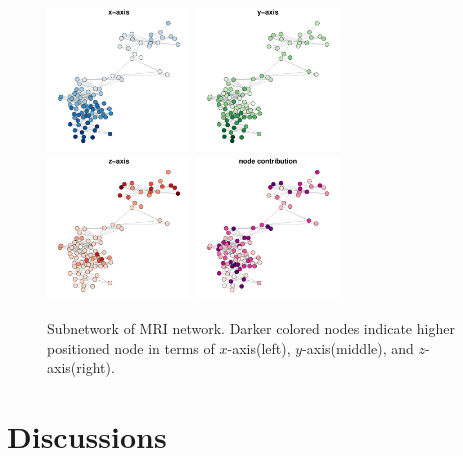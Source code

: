 \documentclass[12pt]{article}
\theoremstyle{definition}
\begin{document}
\begin{figure}[H]
	\centering
		\includegraphics[width=1.5in]{../Figure/brain1_x.pdf}
		\includegraphics[width=1.5in]{../Figure/brain1_y.pdf}
		\includegraphics[width=1.5in]{../Figure/brain1_z.pdf}
		\includegraphics[width=1.5in]{../Figure/brain1_weight.pdf}
	\caption{Subnetwork of MRI network. Darker colored nodes indicate higher positioned node in terms of $x$-axis(left), $y$-axis(middle), and $z$-axis(right).}
		\label{fig:mri}
\end{figure}
	

\section{Discussions}
\label{sec:discussion}
	
\end{document}
